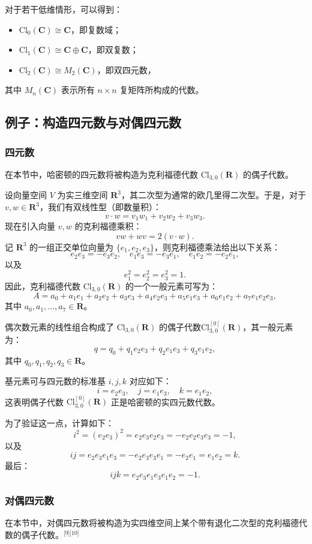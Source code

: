 对于若干低维情形，可以得到：
\begin{itemize}
\item $\mathrm{Cl}_0(\mathbf{C}) \cong \mathbf{C}$，即复数域；
\item $\mathrm{Cl}_1(\mathbf{C}) \cong \mathbf{C} \oplus \mathbf{C}$，即双复数；
\item $\mathrm{Cl}_2(\mathbf{C}) \cong M_2(\mathbf{C})$，即双四元数，
\end{itemize}
其中 $M_n(\mathbf{C})$ 表示所有 $n \times n$ 复矩阵所构成的代数。
\subsection{例子：构造四元数与对偶四元数}
\subsubsection{四元数}
在本节中，哈密顿的四元数将被构造为克利福德代数 $\mathrm{Cl}_{3,0}(\mathbf{R})$ 的偶子代数。

设向量空间 $V$ 为实三维空间 $\mathbf{R}^3$，其二次型为通常的欧几里得二次型。于是，对于 $v, w \in \mathbf{R}^3$，我们有双线性型（即数量积）：
$$
v \cdot w = v_1 w_1 + v_2 w_2 + v_3 w_3.~
$$
现在引入向量 $v, w$ 的克利福德乘积：
$$
vw + wv = 2 (v \cdot w).~
$$
记 $\mathbf{R}^3$ 的一组正交单位向量为 $\{e_1, e_2, e_3\}$，则克利福德乘法给出以下关系：
$$
e_2 e_3 = - e_3 e_2, \quad 
e_1 e_3 = - e_3 e_1, \quad 
e_1 e_2 = - e_2 e_1,~
$$
以及
$$
e_1^2 = e_2^2 = e_3^2 = 1.~
$$
因此，克利福德代数 $\mathrm{Cl}_{3,0}(\mathbf{R})$ 的一个一般元素可写为：
$$
A = a_0 + a_1 e_1 + a_2 e_2 + a_3 e_3 + a_4 e_2 e_3 + a_5 e_1 e_3 + a_6 e_1 e_2 + a_7 e_1 e_2 e_3,~
$$
其中 $a_0, a_1, \ldots, a_7 \in \mathbf{R}$。

偶次数元素的线性组合构成了 $\mathrm{Cl}_{3,0}(\mathbf{R})$ 的偶子代数$\mathrm{Cl}^{[0]}_{3,0}(\mathbf{R})$，其一般元素为：
$$
q = q_0 + q_1 e_2 e_3 + q_2 e_1 e_3 + q_3 e_1 e_2,~
$$
其中 $q_0, q_1, q_2, q_3 \in \mathbf{R}$。

基元素可与四元数的标准基 $i, j, k$ 对应如下：
$$
i = e_2 e_3, \quad j = e_1 e_3, \quad k = e_1 e_2,~
$$
这表明偶子代数 $\mathrm{Cl}^{[0]}_{3,0}(\mathbf{R})$ 正是哈密顿的实四元数代数。

为了验证这一点，计算如下：
$$
i^2 = (e_2 e_3)^2 = e_2 e_3 e_2 e_3 = - e_2 e_2 e_3 e_3 = -1,~
$$
以及
$$
ij = e_2 e_3 e_1 e_3 = - e_2 e_3 e_3 e_1 = - e_2 e_1 = e_1 e_2 = k.~
$$
最后：
$$
ijk = e_2 e_3 e_1 e_3 e_1 e_2 = -1.~
$$
\subsubsection{对偶四元数}
在本节中，对偶四元数将被构造为实四维空间上某个带有退化二次型的克利福德代数的偶子代数。\(^\text{[9][10]}\)

